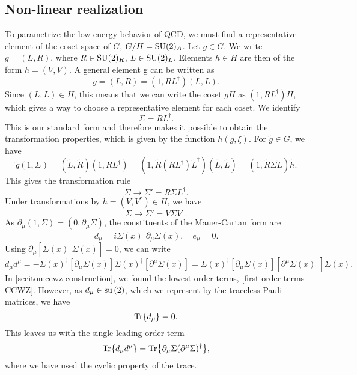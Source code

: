 \subsection*{Non-linear realization}

To parametrize the low energy behavior of QCD, we must find a representative element of the coset space of $G$, $G/H = \mathrm{SU}(2)_A$.
Let $g\in G$. 
We write $g = (L, R)$, where $R \in \mathrm{SU}(2)_R$, $L \in \mathrm{SU}(2)_L$.
Elements $h \in H$ are then of the form $h = (V, V)$.
A general element g can be written as
\begin{equation}
    g = (L, R) = (1, R L^\dagger) (L, L).
\end{equation}
Since $(L, L) \in H$, this means that we can write the coset $g H$ as $(1, R L^\dagger)H$, which gives a way to choose a representative element for each coset.
We identify
\begin{equation}
    \Sigma = R L^\dagger. 
\end{equation}
This is our standard form and therefore makes it possible to obtain the transformation properties, which is given by the function $h(g, \xi)$.
For $\tilde g \in G$, we have 
\begin{equation}
    \tilde g (1, \Sigma)
    = (\tilde L, \tilde R) (1, R L^\dagger)
    = (1, \tilde R (R L^\dagger) \tilde L^\dagger) (\tilde L, \tilde L)
    = (1, \tilde R \Sigma \tilde L) \tilde h.
\end{equation}
This gives the transformation rule
\begin{equation}
    \Sigma \rightarrow \Sigma' = R \Sigma L^\dagger.
\end{equation}
Under transformations by $h = (V, V^\dagger) \in H$, we have
\begin{equation}
    \Sigma \rightarrow \Sigma' = V \Sigma V^\dagger.
\end{equation}
As $\partial_\mu  (1, \Sigma) = (0, \partial_\mu \Sigma)$, the constituents of the Mauer-Cartan form are
\begin{equation}
    d_\mu = i \Sigma(x)^\dagger \partial_\mu \Sigma(x),\quad
    e_\mu = 0.
\end{equation}
Using $\partial_\mu [\Sigma(x)^\dagger\Sigma(x)] = 0 $, we can write
\begin{equation}
    d_\mu d^\mu = 
    - \Sigma(x)^\dagger [\partial_\mu \Sigma(x)] \Sigma(x)^\dagger [\partial^\mu \Sigma(x)]
    =\Sigma(x)^\dagger [\partial_\mu \Sigma(x)] [\partial^\mu \Sigma(x)^\dagger] \Sigma(x).
\end{equation}
In \autoref{seciton:ccwz construction}, we found the lowest order terms, \cref{first order terms CCWZ}.
However, as $d_\mu \in \mathrm{su}\left(2\right)$, which we represent by the traceless Pauli matrices, we have
\begin{equation}
    \Tr{d_\mu} = 0.
\end{equation}
This leaves us with the single leading order term
\begin{equation}
    \Tr{d_\mu d^\mu} = \Tr{\partial_\mu \Sigma (\partial^\mu \Sigma)^\dagger},
\end{equation}
where we have used the cyclic property of the trace.

